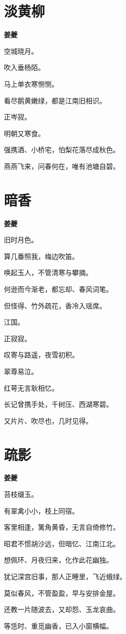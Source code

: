 \documentclass[12pt,a4paper]{ctexbook}
\begin{document}
\section{淡黄柳}
\textbf{姜夔}\par\vspace{0.5em}
空城晓月。\par
吹入垂杨陌。\par
马上单衣寒恻恻。\par
看尽鹅黄嫩绿，都是江南旧相识。\par
正岑寂。\par
明朝又寒食。\par
强携酒、小桥宅，怕梨花落尽成秋色。\par
燕燕飞来，问春何在，唯有池塘自碧。\par

\section{暗香}
\textbf{姜夔}\par\vspace{0.5em}
旧时月色。\par
算几番照我，梅边吹笛。\par
唤起玉人，不管清寒与攀摘。\par
何逊而今渐老，都忘却、春风词笔。\par
但怪得、竹外疏花，香冷入瑶席。\par
江国。\par
正寂寂。\par
叹寄与路遥，夜雪初积。\par
翠尊易泣。\par
红萼无言耿相忆。\par
长记曾携手处，千树压、西湖寒碧。\par
又片片、吹尽也，几时见得。\par

\section{疏影}
\textbf{姜夔}\par\vspace{0.5em}
苔枝缀玉。\par
有翠禽小小，枝上同宿。\par
客里相逢，篱角黄昏，无言自倚修竹。\par
昭君不惯胡沙远，但暗忆、江南江北。\par
想佩环、月夜归来，化作此花幽独。\par
犹记深宫旧事，那人正睡里，飞近蛾绿。\par
莫似春风，不管盈盈，早与安排金屋。\par
还教一片随波去，又却怨、玉龙哀曲。\par
等恁时、重觅幽香，已入小窗横幅。\par
\end{document}
